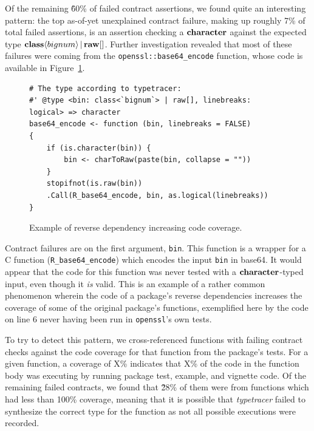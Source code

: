 \documentclass[acmsmall,review,anonymous]{acmart}\settopmatter{printfolios=true,printccs=false,printacmref=false}
\newcommand{\code}[1]{{\lstinline[style=Rin]!#1!}\xspace}
\newcommand{\typetracer}{\emph{typetracer}\xspace} %
\begin{document}
Of the remaining \~60\% of failed contract assertions, we found quite an interesting pattern: the top as-of-yet unexplained contract failure, making up roughly 7\% of total failed assertions, is an assertion checking a ${\bf character}$ against the expected type ${\bf class} \langle bignum \rangle \, | \, {\bf raw}[]$.
Further investigation revealed that most of these failures were coming from the \code{openssl::base64_encode} function, whose code is available in Figure~\ref{fig:base64-encode}.

\begin{figure}[htbp]
\begin{center}

\begin{lstlisting}
# The type according to typetracer:
#' @type <bin: class<`bignum`> | raw[], linebreaks: logical> => character
base64_encode <- function (bin, linebreaks = FALSE) 
{
    if (is.character(bin)) {
        bin <- charToRaw(paste(bin, collapse = ""))
    }
    stopifnot(is.raw(bin))
    .Call(R_base64_encode, bin, as.logical(linebreaks))
}
\end{lstlisting}

\caption{Example of reverse dependency increasing code coverage.}
\label{fig:base64-encode}
\end{center}
\end{figure}

Contract failures are on the first argument, \code{bin}.
This function is a wrapper for a C function (\code{R_base64_encode}) which encodes the input \code{bin} in base64.
It would appear that the code for this function was never tested with a ${\bf character}$-typed input, even though it {\it is} valid.
This is an example of a rather common phenomenon wherein the code of a package's reverse dependencies increases the coverage of some of the original package's functions, exemplified here by the code on line 6 never having been run in \code{openssl}'s own tests.

To try to detect this pattern, we cross-referenced functions with failing contract checks against the code coverage for that function from the package's tests.
For a given function, a coverage of X\% indicates that X\% of the code in the function body was executing by running package test, example, and vignette code.
Of the remaining failed contracts, we found that \~28\% of them were from functions which had less than 100\% coverage, meaning that it is possible that \typetracer failed to synthesize the correct type for the function as not all possible executions were recorded.
\end{document}
